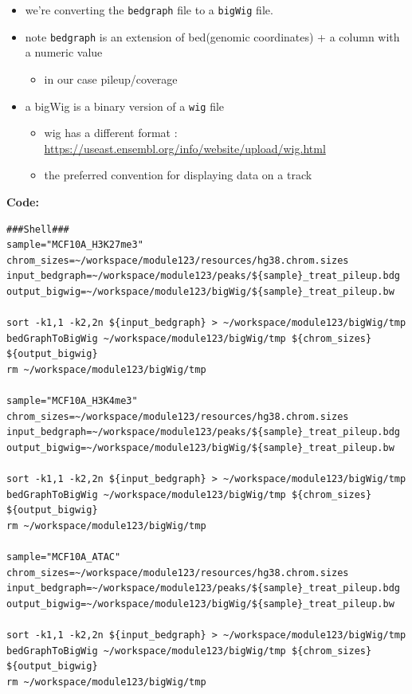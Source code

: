 \documentclass[
]{book}
\providecommand{\tightlist}{%
  \setlength{\itemsep}{0pt}\setlength{\parskip}{0pt}}
\begin{document}
\begin{itemize}
\tightlist
\item
  we're converting the \texttt{bedgraph} file to a \texttt{bigWig} file.
\item
  note \texttt{bedgraph} is an extension of bed(genomic coordinates) + a column with a numeric value

  \begin{itemize}
  \tightlist
  \item
    in our case pileup/coverage
  \end{itemize}
\item
  a bigWig is a binary version of a \texttt{wig} file

  \begin{itemize}
  \tightlist
  \item
    wig has a different format : \url{https://useast.ensembl.org/info/website/upload/wig.html}
  \item
    the preferred convention for displaying data on a track
  \end{itemize}
\end{itemize}

\textbf{Code:}

\begin{verbatim}
###Shell###
sample="MCF10A_H3K27me3"
chrom_sizes=~/workspace/module123/resources/hg38.chrom.sizes
input_bedgraph=~/workspace/module123/peaks/${sample}_treat_pileup.bdg
output_bigwig=~/workspace/module123/bigWig/${sample}_treat_pileup.bw

sort -k1,1 -k2,2n ${input_bedgraph} > ~/workspace/module123/bigWig/tmp
bedGraphToBigWig ~/workspace/module123/bigWig/tmp ${chrom_sizes} ${output_bigwig}
rm ~/workspace/module123/bigWig/tmp

sample="MCF10A_H3K4me3"
chrom_sizes=~/workspace/module123/resources/hg38.chrom.sizes
input_bedgraph=~/workspace/module123/peaks/${sample}_treat_pileup.bdg
output_bigwig=~/workspace/module123/bigWig/${sample}_treat_pileup.bw

sort -k1,1 -k2,2n ${input_bedgraph} > ~/workspace/module123/bigWig/tmp
bedGraphToBigWig ~/workspace/module123/bigWig/tmp ${chrom_sizes} ${output_bigwig}
rm ~/workspace/module123/bigWig/tmp

sample="MCF10A_ATAC"
chrom_sizes=~/workspace/module123/resources/hg38.chrom.sizes
input_bedgraph=~/workspace/module123/peaks/${sample}_treat_pileup.bdg
output_bigwig=~/workspace/module123/bigWig/${sample}_treat_pileup.bw

sort -k1,1 -k2,2n ${input_bedgraph} > ~/workspace/module123/bigWig/tmp
bedGraphToBigWig ~/workspace/module123/bigWig/tmp ${chrom_sizes} ${output_bigwig}
rm ~/workspace/module123/bigWig/tmp
\end{verbatim}
\end{document}
